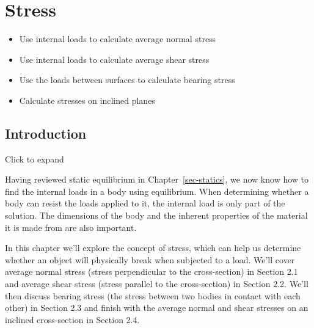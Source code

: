 \documentclass[
  letterpaper,
  DIV=11,
  numbers=noendperiod]{scrreprt}
\providecommand{\tightlist}{%
  \setlength{\itemsep}{0pt}\setlength{\parskip}{0pt}}\usepackage{longtable,booktabs,array}
\theoremstyle{definition}
\theoremstyle{remark}
\begin{document}

\chapter{Stress}\label{sec-stress}

\begin{tcolorbox}[enhanced jigsaw, leftrule=.75mm, colbacktitle=quarto-callout-note-color!10!white, breakable, opacityback=0, colback=white, titlerule=0mm, toprule=.15mm, colframe=quarto-callout-note-color-frame, coltitle=black, title={Learning Objectives}, toptitle=1mm, bottomrule=.15mm, rightrule=.15mm, left=2mm, arc=.35mm, opacitybacktitle=0.6, bottomtitle=1mm]

\begin{itemize}
\tightlist
\item
  Use internal loads to calculate average normal stress
\item
  Use internal loads to calculate average shear stress
\item
  Use the loads between surfaces to calculate bearing stress
\item
  Calculate stresses on inclined planes
\end{itemize}

\end{tcolorbox}

\section*{Introduction}\label{introduction-1}


Click to expand

Having reviewed static equilibrium in Chapter~\ref{sec-statics}, we now
know how to find the internal loads in a body using equilibrium. When
determining whether a body can resist the loads applied to it, the
internal load is only part of the solution. The dimensions of the body
and the inherent properties of the material it is made from are also
important.

In this chapter we'll explore the concept of stress, which can help us
determine whether an object will physically break when subjected to a
load. We'll cover average normal stress (stress perpendicular to the
cross-section) in Section 2.1 and average shear stress (stress parallel
to the cross-section) in Section 2.2. We'll then discuss bearing stress
(the stress between two bodies in contact with each other) in Section
2.3 and finish with the average normal and shear stresses on an inclined
cross-section in Section 2.4.
\end{document}
